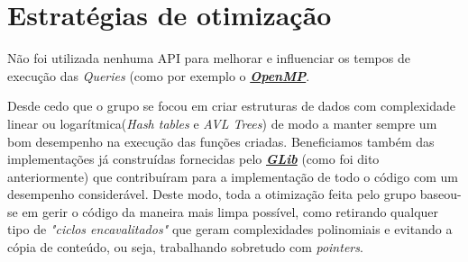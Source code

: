 \documentclass[a4paper]{report}
\begin{document}
\chapter{Estratégias de otimização}\label{ch:otimizacao}
	\tab Não foi utilizada nenhuma API para melhorar e influenciar os tempos de execução das \textit{Queries} (como por exemplo o \href{http://www.openmp.org/}{\textit{\textbf{OpenMP}}}. \par
	Desde cedo que o grupo se focou em criar estruturas de dados com complexidade linear ou logarítmica(\textit{Hash tables} e \textit{AVL Trees}) de modo a manter sempre um bom desempenho na execução das funções criadas. Beneficiamos também das implementações já construídas fornecidas pelo \href{https://developer.gnome.org/glib/}{\textit{\textbf{GLib}}} (como foi dito anteriormente) que contribuíram para a implementação de todo o código com um desempenho considerável.
	Deste modo, toda a otimização feita pelo grupo baseou-se em gerir o código da maneira mais limpa possível, como retirando qualquer tipo de \textit{"ciclos encavalitados"} que geram complexidades polinomiais e evitando a cópia de conteúdo, ou seja, trabalhando sobretudo com \textit{pointers}.
\end{document}
